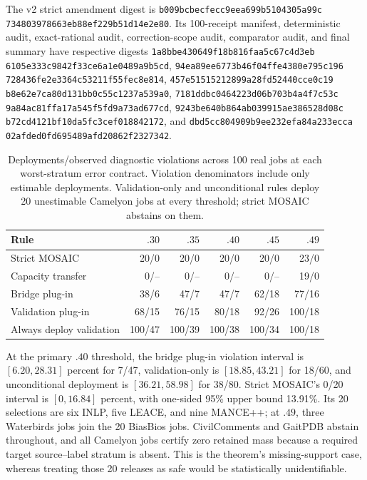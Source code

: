 \begingroup\raggedright
The v2 strict amendment digest is
\texttt{b009bcbecfecc9eea699b5104305a99c}\allowbreak
\texttt{734803978663eb88ef229b51d14e2e80}. Its 100-receipt manifest, deterministic
audit, exact-rational audit, correction-scope audit, comparator audit, and final
summary have respective digests
\texttt{1a8bbe430649f18b816faa5c67c4d3eb}\allowbreak
\texttt{6105e333c9842f33ce6a1e0489a9b5cd},
\texttt{94ea89ee6773b46f04ffe4380e795c196}\allowbreak
\texttt{728436fe2e3364c53211f55fec8e814},
\texttt{457e51515212899a28fd52440cce0c19}\allowbreak
\texttt{b8e62e7ca80d131bb0c55c1237a539a0},
\texttt{7181ddbc0464223d06b703b4a4f7c53c}\allowbreak
\texttt{9a84ac81ffa17a545f5fd9a73ad677cd},
\texttt{9243be640b864ab039915ae386528d08c}\allowbreak
\texttt{b72cd4121bf10da5fc3cef018842172}, and
\texttt{dbd5cc804909b9ee232efa84a233ecca}\allowbreak
\texttt{02afded0fd695489afd20862f2327342}.\par
\endgroup

\begin{table}[t]
\centering
\small
\setlength{\tabcolsep}{4.6pt}
\begin{tabular}{lrrrrr}
\hline
Rule & $.30$ & $.35$ & $.40$ & $.45$ & $.49$ \\
\hline
Strict MOSAIC & 20/0 & 20/0 & 20/0 & 20/0 & 23/0 \\
Capacity transfer & 0/-- & 0/-- & 0/-- & 0/-- & 19/0 \\
Bridge plug-in & 38/6 & 47/7 & 47/7 & 62/18 & 77/16 \\
Validation plug-in & 68/15 & 76/15 & 80/18 & 92/26 & 100/18 \\
Always deploy validation & 100/47 & 100/39 & 100/38 & 100/34 & 100/18 \\
\hline
\end{tabular}
\caption{Deployments/observed diagnostic violations across 100 real jobs at
each worst-stratum error contract. Violation denominators include only
estimable deployments. Validation-only and unconditional rules deploy 20
unestimable Camelyon jobs at every threshold; strict MOSAIC abstains on them.}
\label{supp:tab:real-bridge-thresholds}
\end{table}

At the primary $.40$ threshold, the bridge plug-in violation interval is
$[6.20,28.31]$ percent for 7/47, validation-only is $[18.85,43.21]$ for 18/60,
and unconditional deployment is $[36.21,58.98]$ for 38/80. Strict MOSAIC's
0/20 interval is $[0,16.84]$ percent, with one-sided 95\% upper bound 13.91\%.
Its 20 selections are six INLP, five LEACE, and nine MANCE++; at $.49$, three
Waterbirds jobs join the 20 BiasBios jobs. CivilComments and GaitPDB abstain
throughout, and all Camelyon jobs certify zero retained mass because a required
target source--label stratum is absent. This is the theorem's missing-support
case, whereas treating those 20 releases as safe would be statistically
unidentifiable.

